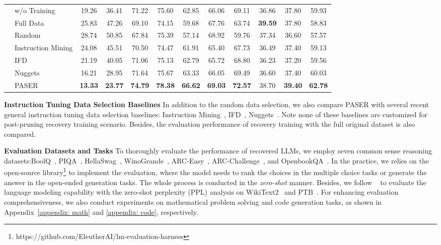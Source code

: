 \begin{table*}[h]
{\begin{tabular}{ll:cc:ccccccc:c}
& w/o Training & 19.26 & 36.41 &71.22  &75.60 & 62.85  & 66.06 & 69.11 &36.86  & 37.80 & 59.93 \\
& Full Data & 25.83 & 47.26 & 69.10 & 74.15 & 59.68 & 67.76 & 63.74 & \textbf{39.59} & 37.80 & 58.83  \\
& Random & 28.74 & 50.85 & 67.84 & 75.39 & 57.14 & 68.92 & 59.76 & 37.34 & 36.60 & 57.57 \\
 & Instruction Mining & 24.08 & 45.51 & 70.50 & 74.47 & 61.91 & 65.40 & 67.73 & 36.49 & 37.40 & 59.13  \\
 & IFD & 21.19 & 40.05 & 71.06 & 75.13 & 62.79 & 65.72 & 68.80 & 36.23 & 37.20 & 59.56  \\
 & Nuggets & 16.21 & 28.95 & 71.64 & 75.67 & 63.33 & 66.05 & 69.49 & 36.60 & 37.40 & 60.03  \\
 & PASER & \textbf{13.33} & \textbf{23.77} & \textbf{74.79} & \textbf{78.38} & \textbf{66.62} & \textbf{69.03} & \textbf{72.57} & 38.70 & \textbf{39.40} & \textbf{62.78}   \\
\hline
\bottomrule
\end{tabular}}
\label{tab: different pruning}
\end{table*}

\textbf{Instruction Tuning Data Selection Baselines} In addition to the random data selection, we also compare PASER with several recent general instruction tuning data selection baselines: Instruction Mining~\citep{caoinstruction}, IFD~\citep{li2024quantity}, Nuggets~\citep{li2024nuggets}. Note none of these baselines are customized for post-pruning recovery training scenario. Besides, the evaluation performance of recovery training with the full original dataset is also compared.

\textbf{Evaluation Datasets and Tasks} To thoroughly evaluate the performance of recovered LLMs, we employ seven common sense reasoning datasets:BoolQ~\citep{clark2019boolq}, PIQA~\citep{bisk2020piqa}, HellaSwag~\citep{zellers2019hellaswag}, WinoGrande~\citep{sakaguchi2021winogrande}, ARC-Easy~\citep{clark2018think}, ARC-Challenge~\citep{clark2018think}, and OpenbookQA~\citep{mihaylov2018can}. In the practice, we relies on the open-source library\footnote{https://github.com/EleutherAI/lm-evaluation-harness} to implement the evaluation, where the model needs to rank the choices in the multiple choice tasks or generate the answer in the open-ended generation tasks. The whole process is conducted in the \textit{zero-shot} manner. Besides, we follow ~\citep{ma2023llm} to evaluate the language modeling capability with the zero-shot perplexity (PPL) analysis on WikiText2~\citep{merity2022pointer} and PTB~\citep{marcus1993building}.
For enhancing evaluation comprehensiveness, we also conduct experiments on mathematical problem solving and code generation tasks, as shown in Appendix~\ref{appendix: math} and \ref{appendix: code}, respectively.

